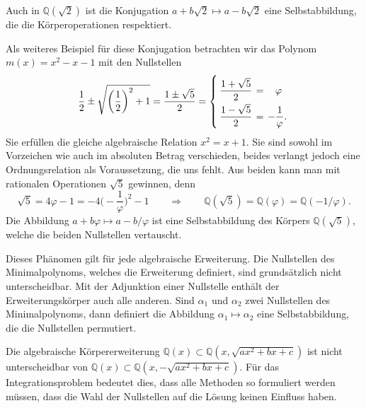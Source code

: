 Auch in $\mathbb{Q}(\!\sqrt{2})$ ist die Konjugation
$a+b\sqrt{2}\mapsto a-b\sqrt{2}$ eine Selbstabbildung, die
die Körperoperationen respektiert.

Als weiteres Beispiel für diese Konjugation betrachten wir
das Polynom $m(x)=x^2-x-1$ mit den Nullstellen
\[
\frac12 \pm\sqrt{\biggl(\frac12\biggr)^2+1}
=
\frac{1\pm\sqrt{5}}{2}
=
\left\{
\bgroup
\renewcommand{\arraystretch}{2.20}
\renewcommand{\arraycolsep}{2pt}
\begin{array}{lcl}
\displaystyle
\frac{1+\sqrt{5}}{2} &=& \phantom{-}\varphi \\
\displaystyle
\frac{1-\sqrt{5}}{2} &=& \displaystyle-\frac{1}{\varphi}.
\end{array}
\egroup
\right.
\]
Sie erfüllen die gleiche algebraische Relation $x^2=x+1$.
Sie sind sowohl im Vorzeichen wie auch im absoluten Betrag 
verschieden, beides verlangt jedoch eine Ordnungsrelation als
Voraussetzung, die uns fehlt.
Aus beiden kann man mit rationalen Operationen $\sqrt{5}$ gewinnen,
denn
\[
\sqrt{5}
=
4\varphi-1
=
-4\biggl(-\frac{1}{\varphi}\biggr)^2-1
\qquad\Rightarrow\qquad
\mathbb{Q}(\!\sqrt{5})
=
\mathbb{Q}(\varphi)
=
\mathbb{Q}(-1/\varphi).
\]
Die Abbildung $a+b\varphi\mapsto a-b/\varphi$ ist eine Selbstabbildung
des Körpers $\mathbb{Q}(\!\sqrt{5})$, welche die beiden Nullstellen 
vertauscht.

Dieses Phänomen gilt für jede algebraische Erweiterung.
Die Nullstellen des Minimalpolynoms, welches die Erweiterung
definiert, sind grundsätzlich nicht unterscheidbar.
Mit der Adjunktion einer Nullstelle enthält der Erweiterungskörper
auch alle anderen.
Sind $\alpha_1$ und $\alpha_2$ zwei Nullstellen des Minimalpolynoms,
dann definiert die Abbildung $\alpha_1\mapsto\alpha_2$ eine Selbstabbildung,
die die Nullstellen permutiert.

Die algebraische Körpererweiterung
$\mathbb{Q}(x)\subset \mathbb{Q}(x,\sqrt{ax^2+bx+c})$
ist nicht unterscheidbar von
$\mathbb{Q}(x)\subset \mathbb{Q}(x,-\!\sqrt{ax^2+bx+c})$.
Für das Integrationsproblem bedeutet dies, dass alle Methoden so
formuliert werden müssen, dass die Wahl der Nullstellen auf die
Lösung keinen Einfluss haben.


